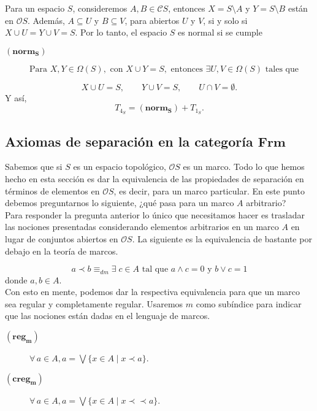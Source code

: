 \documentclass{comunicaciones}
\begin{document}
Para un espacio $S$, consideremos $A, B \in \mathcal{C}S$, entonces $X=S\setminus A$ y $Y=S\setminus B$ están en $\mathcal{O}S$. Además, $A\subseteq U$ y $B\subseteq V$, para abiertos $U$ y $V$, si y solo si $X\cup U= Y\cup V=S$. Por lo tanto, el espacio $S$ es normal si se cumple

\begin{description}
\item[$(\mathbf{norm_S})$] $\mbox{Para } X, Y\in \Omega(S), \mbox{ con } X\cup Y=S, \mbox{ entonces } \exists U, V\in \Omega(S) \mbox{ tales que}$
\end{description}
\[
X\cup U=S, \qquad Y\cup V=S,\qquad U\cap V=\emptyset.
\]
Y así, 
\[
T_{4_S}=(\mathbf{norm_S})+T_{1_S}.
\]

\subsection{Axiomas de separación en la categoría $\mathbf{Frm}$}
Sabemos que si $S$ es un espacio topológico, $\mathcal{O}S$ es un marco. Todo lo que hemos hecho en esta sección es dar la equivalencia de las propiedades de separación en términos de elementos en $\mathcal{O}S$, es decir, para un marco particular. En este punto debemos preguntarnos lo siguiente, ¿qué pasa para un marco $A$ arbitrario?\\

\noindent
Para responder la pregunta anterior lo único que necesitamos hacer es trasladar las nociones presentadas considerando elementos arbitrarios en un marco $A$ en lugar de conjuntos abiertos en $\mathcal{O}S$. La siguiente es la equivalencia de bastante por debajo en la teoría de marcos.

\[
a\prec b \equiv_{dm} \exists \; c\in A \mbox{ tal que } a\wedge c=0 \mbox{ y } b\vee c=1
\]
donde $a, b\in A$.\\

Con esto en mente, podemos dar la respectiva equivalencia para que un marco sea regular y completamente regular.  Usaremos $m$ como subíndice para indicar que las nociones están dadas en el lenguaje de marcos.

\begin{description}
\item[$(\mathbf{reg_m})$] $\forall\, a\in A, a=\bigvee\{x\in A\mid x\prec a\}$.
\item[$(\mathbf{creg_m})$] $\forall\, a\in A, a=\bigvee\{x\in A\mid x\prec \prec a\}$.
\end{description}
\end{document}
